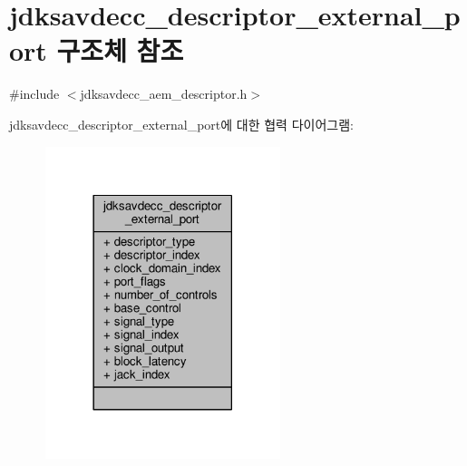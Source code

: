 \hypertarget{structjdksavdecc__descriptor__external__port}{}\section{jdksavdecc\+\_\+descriptor\+\_\+external\+\_\+port 구조체 참조}
\label{structjdksavdecc__descriptor__external__port}


{\ttfamily \#include $<$jdksavdecc\+\_\+aem\+\_\+descriptor.\+h$>$}



jdksavdecc\+\_\+descriptor\+\_\+external\+\_\+port에 대한 협력 다이어그램\+:
\nopagebreak
\begin{figure}[H]
\begin{center}
\leavevmode
\includegraphics[width=194pt]{structjdksavdecc__descriptor__external__port__coll__graph}
\end{center}
\end{figure}
